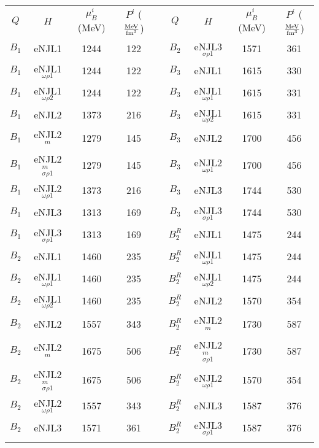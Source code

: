 \documentclass{ws-ijmpcs}
\begin{document}
\begin{table}[ph]
{\begin{tabular}{@{}ccccccccc@{}} \toprule
$Q$ & $H$ & $\mu_B^i$ (MeV) & $P^i$ ($\frac{\rm{MeV}}{\rm{fm}^3}$) && $Q$ & $H$ & $\mu_B^i$ (MeV) & $P^i$ ($\frac{\rm{MeV}}{\rm{fm}^3}$)  \\ \colrule
$B_1$ & eNJL1 & 1244 & 122                    &&   $B_2$ & eNJL3$_{\sigma\rho 1}$ & 1571 & 361    \\
$B_1$ & eNJL1$_{\omega\rho 1}$ & 1244 & 122   &&   $B_3$ & eNJL1 & 1615 & 330                 \\
$B_1$ & eNJL1$_{\omega\rho 2}$ & 1244 & 122   &&   $B_3$ & eNJL1$_{\omega\rho 1}$ & 1615 & 331    \\
$B_1$ & eNJL2 & 1373 & 216                    &&   $B_3$ & eNJL1$_{\omega\rho 2}$ & 1615 & 331    \\
$B_1$ & eNJL2$^m$ & 1279 & 145                   &&   $B_3$ & eNJL2 & 1700 & 456                 \\
$B_1$ & eNJL2$^m_{\sigma\rho 1}$ & 1279 & 145  &&   $B_3$ & eNJL2$_{\omega\rho 1}$ & 1700 & 456    \\
$B_1$ & eNJL2$_{\omega\rho 1}$ & 1373 & 216   &&   $B_3$ & eNJL3 & 1744 & 530                 \\
$B_1$ & eNJL3 & 1313 & 169                    &&   $B_3$ & eNJL3$_{\sigma\rho 1}$ & 1744 & 530    \\
$B_1$ & eNJL3$_{\sigma\rho 1}$ & 1313 & 169   &&   $B_2^R$ & eNJL1 & 1475 & 244                \\
$B_2$ & eNJL1 & 1460 & 235                    &&   $B_2^R$ & eNJL1$_{\omega\rho 1}$ & 1475 & 244   \\
$B_2$ & eNJL1$_{\omega\rho 1}$ & 1460 & 235   &&   $B_2^R$ & eNJL1$_{\omega\rho 2}$ & 1475 & 244   \\
$B_2$ & eNJL1$_{\omega\rho 2}$ & 1460 & 235   &&   $B_2^R$ & eNJL2 & 1570 & 354                \\
$B_2$ & eNJL2 & 1557 & 343                    &&   $B_2^R$ & eNJL2$^m$ & 1730 & 587               \\
$B_2$ & eNJL2$^m$ & 1675 & 506                   &&   $B_2^R$ & eNJL2$^m_{\sigma\rho 1}$ & 1730 & 587  \\
$B_2$ & eNJL2$^m_{\sigma\rho 1}$ & 1675 & 506  &&   $B_2^R$ & eNJL2$_{\omega\rho 1}$ & 1570 & 354   \\
$B_2$ & eNJL2$_{\omega\rho 1}$ & 1557 & 343   &&   $B_2^R$ & eNJL3 & 1587 & 376                \\
$B_2$ & eNJL3 & 1571 & 361                    &&   $B_2^R$ & eNJL3$_{\sigma\rho 1}$ & 1587 & 376   \\
\botrule
\end{tabular} \label{Tab:Transition_chemical_pot}}
\end{table}
\end{document}
